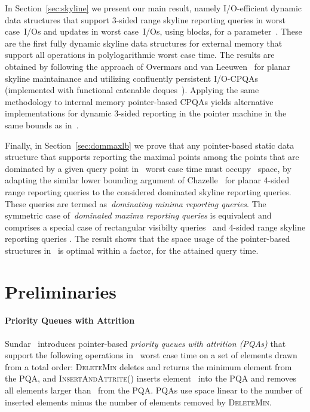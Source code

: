 \documentclass[]{article}
\begin{document}
In Section~\ref{sec:skyline} we present our main result, namely I/O-efficient
dynamic data structures that support 3-sided range skyline reporting queries in
 worst case~I/Os and
updates in  worst case~I/Os, using
 blocks, for a parameter~. These are the first fully dynamic skyline data structures for external
memory that support all operations in polylogarithmic worst case time. The
results are obtained by following the approach of Overmars and van
Leeuwen~\cite{OL81} for planar skyline maintainance and utilizing confluently
persistent I/O-CPQAs (implemented with functional catenable deques~\cite{KT99}).
Applying the same methodology to internal memory pointer-based CPQAs yields
alternative implementations for dynamic 3-sided reporting in the pointer machine in the same bounds as in~\cite{BT11}.

Finally, in Section~\ref{sec:dommaxlb} we prove that any pointer-based static
data structure that supports reporting the maximal points among the points that
are dominated by a given query point in~ worst case
time must occupy~ space, by adapting the
similar lower bounding argument of Chazelle~\cite{C90} for planar 4-sided range
reporting queries to the considered dominated skyline reporting queries. These
queries are termed as~\textit{dominating minima reporting queries}. The
symmetric case of~\textit{dominated maxima reporting queries} is equivalent and
comprises a special case of rectangular visibilty queries~\cite{OW88} and
4-sided range skyline reporting queries \cite{BT11,KDKS11}. The result shows
that the space usage of the pointer-based structures in~\cite{OW88,BT11,KDKS11}
is optimal within a  factor, for the attained query time.

\section{Preliminaries} \label{sect:prel}


\paragraph{Priority Queues with Attrition} 

Sundar~\cite{S89} introduces pointer-based \emph{priority queues with attrition
(PQAs)} that support the following operations in~ worst case time on
a set of elements drawn from a total order: \textsc{DeleteMin} deletes and
returns the minimum element from the PQA, and \textsc{InsertAndAttrite()}
inserts element~ into the PQA and removes all elements larger than~ from
the PQA. PQAs use space linear to the number of inserted elements minus the
number of elements removed by \textsc{DeleteMin}.
\end{document}
